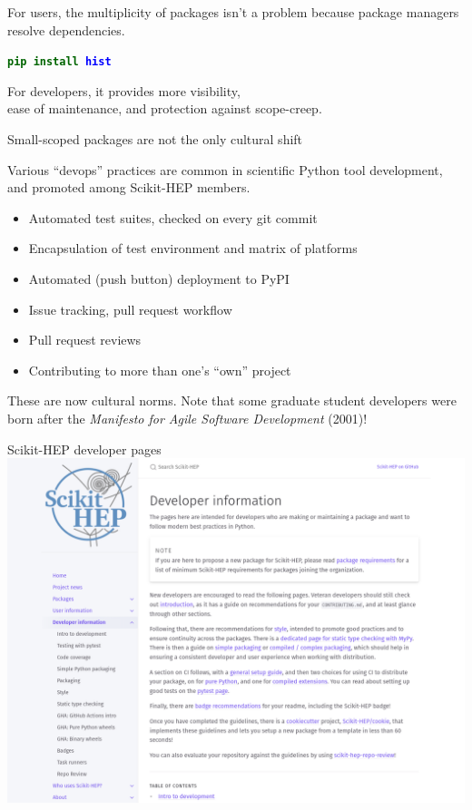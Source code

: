 \documentclass[aspectratio=169]{beamer}
\begin{document}
\begin{frame}{}
\vspace{1 cm}
\Large

\begin{center}
For users, the multiplicity of packages isn't a problem because package managers resolve dependencies.

\vspace{1 cm}
\texttt{\textbf{\textcolor{darkgreen}{pip install} \textcolor{blue}{hist}}}

\vspace{1 cm}
For developers, it provides more visibility, \\ ease of maintenance, and protection against scope-creep.
\end{center}
\end{frame}

\begin{frame}{Small-scoped packages are not the only cultural shift}
\vspace{0.5 cm}
\large

Various ``devops'' practices are common in scientific Python tool development, and promoted among Scikit-HEP members.

\vspace{0.25 cm}
\begin{itemize}
\item Automated test suites, checked on every git commit
\item Encapsulation of test environment and matrix of platforms
\item Automated (push button) deployment to PyPI
\item Issue tracking, pull request workflow
\item Pull request reviews
\item Contributing to more than one's ``own'' project
\end{itemize}

\vspace{0.5 cm}
These are now cultural norms. Note that some graduate student developers were born after the {\it Manifesto for Agile Software Development} (2001)!
\end{frame}

\begin{frame}{Scikit-HEP developer pages}
\vspace{0.18 cm}
\mbox{ } \hfill \includegraphics[width=0.755\linewidth]{PLOTS/developer-pages-screenshot.png} \hfill \mbox{ }
\end{frame}
\end{document}
